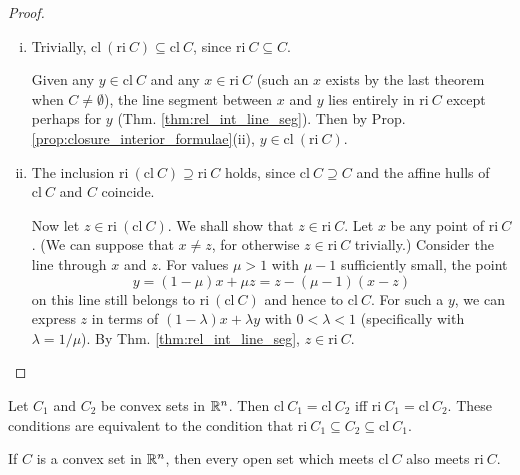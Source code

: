 \documentclass[11pt,a4paper]{article}
\begin{document}
\begin{proof}
    \begin{enumerate}[(i)]
        \item \forward Trivially, $\mathrm{cl}\ (\mathrm{ri}\ C) \subseteq \mathrm{cl}\ C$, since $\mathrm{ri}\ C\subseteq C$.
        
        \converse Given any $y\in \mathrm{cl}\ C$ and any $x\in \mathrm{ri}\ C$ (such an $x$ exists by the last theorem when $C\neq \emptyset$), the line segment between $x$ and $y$ lies entirely in $\mathrm{ri}\ C$ except perhaps for $y$ (Thm. \ref{thm:rel_int_line_seg}). Then by Prop. \ref{prop:closure_interior_formulae}(ii), $y\in \mathrm{cl}\ (\mathrm{ri}\ C)$.

        \item \converse The inclusion $\mathrm{ri}\ (\mathrm{cl}\ C)\supseteq \mathrm{ri}\ C$ holds, since $\mathrm{cl}\ C\supseteq C$ and the affine hulls of $\mathrm{cl}\ C$ and $C$ coincide.
        
        \forward Now let $z\in \mathrm{ri}\ (\mathrm{cl}\ C)$. We shall show that $z\in \mathrm{ri}\ C$. Let $x$ be any point of $\mathrm{ri}\ C$. (We can suppose that $x\neq z$, for otherwise $z\in \mathrm{ri}\ C$ trivially.) Consider the line through $x$ and $z$. For values $\mu>1$ with $\mu-1$ sufficiently small, the point
        \begin{equation*}
            y = (1-\mu) x+ \mu z = z - (\mu-1)(x-z)
        \end{equation*}
        on this line still belongs to $\mathrm{ri}\ (\mathrm{cl}\ C)$ and hence to $\mathrm{cl}\ C$. For such a $y$, we can express $z$ in terms of $(1-\lambda)x+\lambda y$ with $0<\lambda <1$ (specifically with $\lambda=1/\mu$). By Thm. \ref{thm:rel_int_line_seg}, $z\in \mathrm{ri}\ C$.
    \end{enumerate}
\end{proof}

\begin{corollary}
    Let $C_1$ and $C_2$ be convex sets in $\mathbb{R}^n$. Then $\mathrm{cl}\ C_1 = \mathrm{cl}\ C_2$ iff $\mathrm{ri}\ C_1 = \mathrm{cl}\ C_2$. These conditions are equivalent to the condition that $\mathrm{ri}\ C_1\subseteq C_2\subseteq \mathrm{cl}\ C_1$.
\end{corollary}

\begin{corollary}
    If $C$ is a convex set in $\mathbb{R}^n$, then every open set which meets $\mathrm{cl}\ C$ also meets $\mathrm{ri}\ C$.
\end{corollary}
\end{document}
